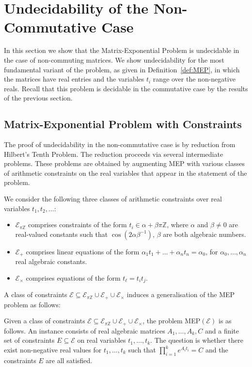 \section{Undecidability of the Non-Commutative Case}

In this section we show that the Matrix-Exponential Problem is
undecidable in the case of non-commuting matrices.  We show
undecidability for the most fundamental variant of the problem, as
given in Definition~\ref{def:MEP}, in which the matrices have real
entries and the variables $t_i$ range over the non-negative reals.
Recall that this problem is decidable in the commutative case by the
results of the previous section.

\subsection{Matrix-Exponential Problem with Constraints}

The proof of undecidability in the non-commutative case is by
reduction from Hilbert's Tenth Problem.  The reduction proceeds via
several intermediate problems.  These problems are obtained by
augmenting MEP with various classes of arithmetic constraints on the
real variables that appear in the statement of the problem.

\begin{definition}
  We consider the following three classes of arithmetic constraints
  over real variables $t_1,t_2,\ldots$:
\begin{itemize}
\item $\mathcal{E}_{\pi\mathbb{Z}}$ comprises constraints of the form
  $t_i\in\alpha+\beta\pi\mathbb{Z}$, where $\alpha$ and $\beta\neq 0$
  are real-valued constants such that $\cos(2\alpha\beta^{-1})$,
  $\beta$ are both algebraic numbers.
\item $\mathcal{E}_{+}$ comprises linear equations of the form
  $\alpha_1 t_1 + \ldots + \alpha_n t_n = \alpha_0 $, for
  $\alpha_0,\ldots,\alpha_n$ real algebraic constants.
\item $\mathcal{E}_{\times}$ comprises equations of the form
  $t_\ell=t_it_j$.
\end{itemize}
\end{definition}

A class of constraints $\mathcal{E} \subseteq \mathcal{E}_{\pi\mathbb{Z}} \cup
\mathcal{E}_{+}\cup \mathcal{E}_{\times}$ 
induces a generalisation of the MEP problem as follows:
\begin{definition}
  Given a class of constraints
  $\mathcal{E} \subseteq \mathcal{E}_{\pi\mathbb{Z}} \cup
  \mathcal{E}_{+}\cup \mathcal{E}_{\times}$,
  the problem MEP$(\mathcal{E})$ is as follows.  An instance consists
  of real algebraic matrices $A_1,\ldots,A_k,C$ and a finite set of
  constraints $E\subseteq\mathcal{E}$ on real variables
  $t_1,\ldots,t_k$.  The question is whether there exist non-negative
  real values for $t_1,\ldots,t_k$ such that
  $\prod_{i=1}^ke^{A_it_i}=C$ and the constraints $E$ are all
  satisfied.
\label{def:contraintMEP}
\end{definition}

